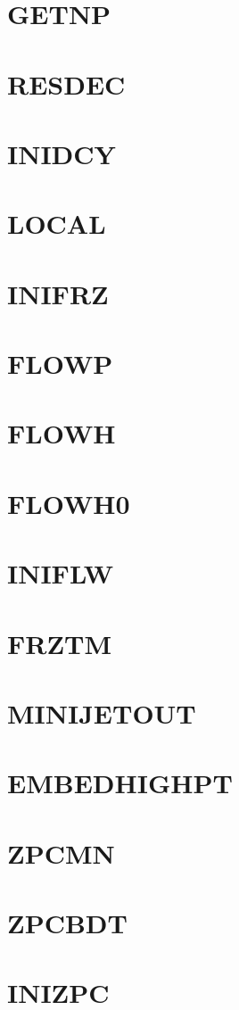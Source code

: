 \documentclass[14pt,UTF8]{ctexbook}
\begin{document}
\section{GETNP}
\section{RESDEC}
\section{INIDCY}
\section{LOCAL}
\section{INIFRZ}
\section{FLOWP}
\section{FLOWH}
\section{FLOWH0}
\section{INIFLW}
\section{FRZTM}
\section{MINIJETOUT}
\section{EMBEDHIGHPT}
\section{ZPCMN}
\section{ZPCBDT}
\section{INIZPC}
\end{document}
